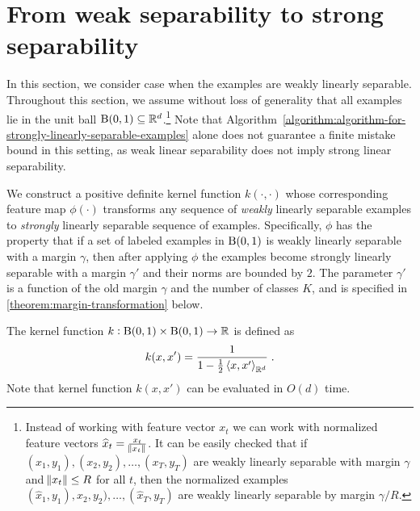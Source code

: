 \section{From weak separability to strong separability}
\label{section:from-weak-separability-to-strong-separability}

In this section, we consider case when the examples are weakly linearly
separable. Throughout this section, we assume without loss of generality that
all examples lie in the unit ball $\operatorname{B}(0,1) \subseteq \mathbb{R}^d$.\footnote{Instead of
working with feature vector $x_t$ we can work with normalized feature vectors
$\widehat{x}_t = \frac{x_t}{\norm{x_t}}$. It can be easily checked that if
$(x_1,y_1), (x_2,y_2), \dots, (x_T,y_T)$ are weakly linearly separable with
margin $\gamma$ and $\norm{x_t} \le R$ for all $t$, then the normalized examples
$(\widehat{x}_1,y_1), \widehat{x}_2,y_2), \dots, (\widehat{x}_T,y_T)$ are weakly
linearly separable by margin $\gamma/R$.} Note that
Algorithm~\ref{algorithm:algorithm-for-strongly-linearly-separable-examples}
alone does not guarantee a finite mistake bound in this setting, as weak linear
separability does not imply strong linear separability.

We construct a positive definite kernel function $k(\cdot, \cdot)$ whose
corresponding feature map $\phi(\cdot)$ transforms any sequence of \emph{weakly}
linearly separable examples to \emph{strongly} linearly separable sequence of
examples. Specifically, $\phi$ has the property that if a set of labeled
examples in $\operatorname{B}(0,1)$ is weakly linearly separable with a margin $\gamma$, then
after applying $\phi$ the examples become strongly linearly separable with a
margin $\gamma'$ and their norms are bounded by $2$. The parameter $\gamma'$ is
a function of the old margin $\gamma$ and the number of classes $K$, and is
specified in \autoref{theorem:margin-transformation} below.

The kernel function $k:\operatorname{B}(0,1) \times \operatorname{B}(0,1) \to \mathbb{R}$ is defined as
$$
k(x,x') = \frac{1}{1 - \frac{1}{2}\left\langle x, x' \right\rangle_{\mathbb{R}^d}} \; .
$$
Note that kernel function $k(x,x')$ can be evaluated in $O(d)$ time.


